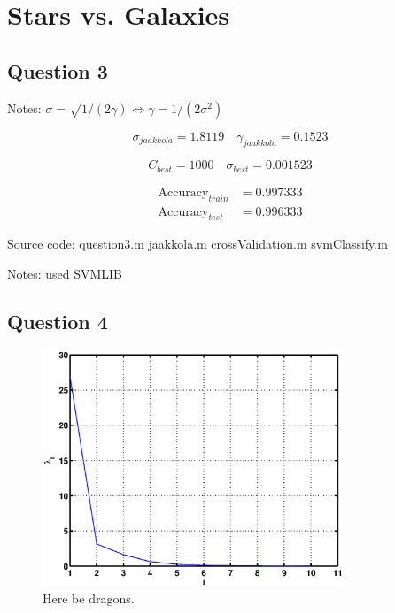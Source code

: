 \documentclass[a4paper, 11pt]{article}
\begin{document}

\section{Stars vs. Galaxies} %
\label{sec:stars_vs_galaxies}

\subsection*{Question 3}

Notes: $\sigma = \sqrt{1 / (2 \gamma)} \Leftrightarrow \gamma = 1 / (2 \sigma^2)$

\[
    \sigma_{\mathit{jaakkola}} = 1.8119 \quad \gamma_{\mathit{jaakkola}} = 0.1523
\]

\[
    C_{\mathit{best}} = 1000 \quad \sigma_{\mathit{best}} = 0.001523
\]

\begin{align*}
    \mathrm{Accuracy}_{\mathit{train}} &= 0.997333 \\
    \mathrm{Accuracy}_{\mathit{test}} &= 0.996333
\end{align*}

Source code: question3.m jaakkola.m crossValidation.m svmClassify.m

Notes: used SVMLIB

\subsection*{Question 4}

\begin{figure}[H]
    \centering
    \includegraphics[width=0.8\textwidth]{figures/question4_1}
    \caption{Here be dragons.}\label{fig:question4_1}
\end{figure}
\end{document}
